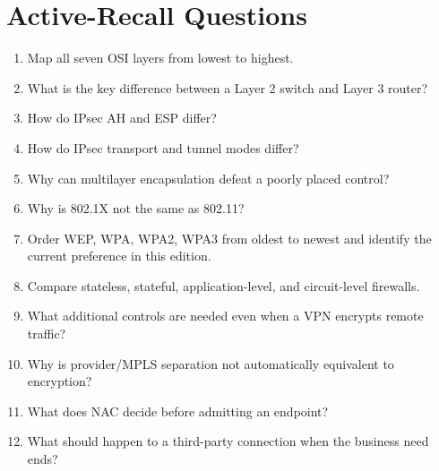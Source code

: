 \documentclass[10pt,letterpaper]{article}
\begin{document}
\section{Active-Recall Questions}
\begin{enumerate}
\item Map all seven OSI layers from lowest to highest.
\item What is the key difference between a Layer 2 switch and Layer 3 router?
\item How do IPsec AH and ESP differ?
\item How do IPsec transport and tunnel modes differ?
\item Why can multilayer encapsulation defeat a poorly placed control?
\item Why is 802.1X not the same as 802.11?
\item Order WEP, WPA, WPA2, WPA3 from oldest to newest and identify the current preference in this edition.
\item Compare stateless, stateful, application-level, and circuit-level firewalls.
\item What additional controls are needed even when a VPN encrypts remote traffic?
\item Why is provider/MPLS separation not automatically equivalent to encryption?
\item What does NAC decide before admitting an endpoint?
\item What should happen to a third-party connection when the business need ends?
\end{enumerate}
\end{document}
